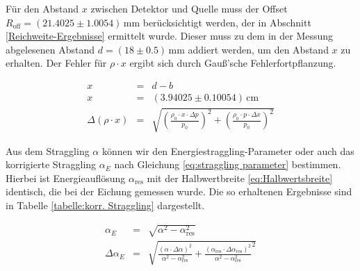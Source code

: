 \documentclass[12pt,a4paper]{scrartcl}
\numberwithin{equation}{section} %
\begin{document}
Für den Abstand $x$ zwischen Detektor und Quelle muss der Offset $R_\mathrm{off}=(21.4025 \pm 1.0054) \mathrm{\,mm}$ berücksichtigt werden, der in Abschnitt \ref{Reichweite-Ergebnisse} ermittelt wurde. Dieser muss zu dem in der Messung abgelesenen Abstand $d=(18\pm0.5)\mathrm{\,mm}$ addiert werden, um den Abstand $x$ zu erhalten. Der Fehler für $\rho \cdot x$ ergibt sich durch Gauß'sche Fehlerfortpflanzung.

\begin{eqnarray}
	x &=& d-b\\
	x &=& (3.94025 \pm 0.10054)\mathrm{\,cm} \\
	\Delta (\rho \cdot x) &=& \sqrt{
			\left(\frac{\rho _0 \cdot x \cdot \Delta p}{p_0}\right)^2
			+ \left(\frac{\rho _0 \cdot p \cdot \Delta x}{p_0}\right)^2
		}
\end{eqnarray}

Aus dem Straggling $\alpha$ können wir den Energiestraggling-Parameter oder auch das korrigierte Straggling $\alpha_E$ nach Gleichung \eqref{eq:straggling parameter} bestimmen. Hierbei ist Energieauflösung $\alpha _\mathrm{res}$ mit der Halbwertbreite \eqref{eq:Halbwertsbreite} identisch, die bei der Eichung gemessen wurde. Die so erhaltenen Ergebnisse sind in Tabelle \ref{tabelle:korr. Straggling} dargestellt.

\begin{eqnarray}
	\alpha _E&=& \sqrt{\alpha ^2 - \alpha_\mathrm{res}^2} \\
	\Delta \alpha _E&=& \sqrt{
		\frac{(\alpha\cdot\Delta\alpha)^2}{\alpha ^2 - \alpha_\mathrm{res}^2}
		+ \frac{(\alpha_\mathrm{res} \cdot \Delta \alpha_\mathrm{res})^2}{\alpha ^2 - \alpha_\mathrm{res}^2}^2
	}
\end{eqnarray}
\end{document}
